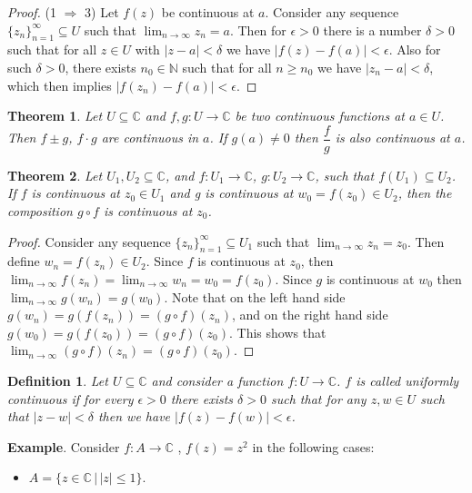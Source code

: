 \documentclass{amsart}
\newtheorem{thm}{Theorem}
\newtheorem{mydef}{Definition}
\begin{document}
\begin{proof}
(1 \(\Rightarrow\) 3) Let \(f(z)\) be continuous at \(a\). Consider any sequence \(\{z_n\}_{n=1}^{\infty}\subseteq U\) such that \(\lim_{n\to \infty} z_n = a\). Then for \(\epsilon >0\) there is a number \(\delta >0\) such that for all \(z\in U\) with \(|z-a|<\delta\) we have \(|f(z) - f(a)| < \epsilon\). Also for such \(\delta >0\), there exists \(n_0\in \mathbb{N}\) such that for all \(n\geq n_0\) we have \(|z_n - a| < \delta\), which then implies \(|f(z_n) - f(a)| < \epsilon\).
\end{proof}


\begin{thm}
Let \(U\subseteq\mathbb{C}\) and \(f,g:U\to \mathbb{C}\) be two continuous functions  at \(a\in U\). Then \(f\pm g\), \(f\cdot g\) are continuous in \(a\). If \(g(a) \neq 0\) then \(\dfrac{f}{g}\) is also continuous at \(a\).
\end{thm}


\begin{thm}
Let \(U_1, U_2 \subseteq \mathbb{C}\), and \(f:U_1\to \mathbb{C}\), \(g:U_2\to \mathbb{C}\), such that \(f(U_1)\subseteq U_2\). If \(f\) is continuous at \(z_0\in U_1\) and g is continuous at \(w_0 = f(z_0)\in U_2\), then the composition \(g\circ f\) is continuous at \(z_0\).
\end{thm}
\begin{proof}
Consider any sequence \(\{z_n\}_{n=1}^{\infty}\subseteq U_1\) such that \(\lim_{n\to \infty}z_n = z_0\). Then define \(w_n = f(z_n) \in U_2\). Since \(f\) is continuous at \(z_0\), then \(\lim_{n\to\infty}f(z_n) = \lim_{n\to\infty}w_n = w_0 = f(z_0)\). Since \(g\) is continuous at \(w_0\) then \(\lim_{n\to \infty}g(w_n) = g(w_0)\). Note that on the left hand side \(g(w_n) = g(f(z_n)) = (g\circ f)(z_n)\), and on the right hand side \(g(w_0) = g(f(z_0)) = (g\circ f)(z_0)\). This shows that \(\lim_{n\to\infty}(g\circ f)(z_n) = (g\circ f)(z_0)\).
\end{proof}


\begin{mydef}
Let \(U\subseteq \mathbb{C}\) and consider a function \(f:U\to\mathbb{C}\). \(f\) is called uniformly continuous if for every \(\epsilon >0\) there exists \(\delta >0\) such that for any \(z,w\in U\) such that \(|z-w| < \delta\) then we have \(|f(z) - f(w) | < \epsilon\).
\end{mydef}

\textbf{Example}. Consider \(f: A\to \mathbb{C}\) , \(f(z) = z^2\) in the following cases:
\begin{itemize}
\item \(A = \{z\in \mathbb{C} \, |\, |z| \leq 1\}\).
\end{itemize}
\end{document}
